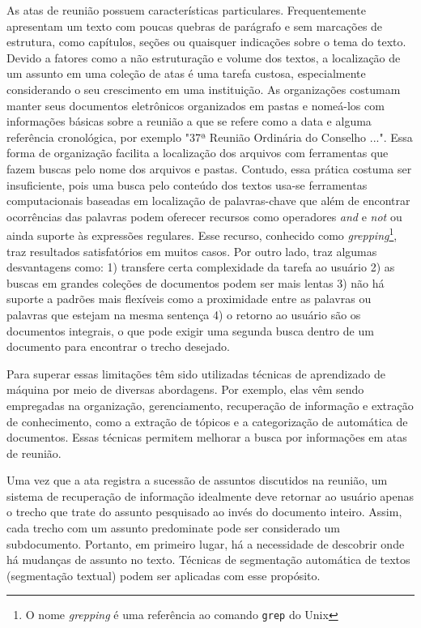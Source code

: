 As atas de reunião possuem características particulares. Frequentemente apresentam um texto com poucas quebras de parágrafo e sem marcações de estrutura, como capítulos, seções ou quaisquer indicações sobre o tema do texto. Devido a fatores como a não estruturação e volume dos textos, a localização de um assunto em uma coleção de atas é uma tarefa custosa, especialmente considerando o seu crescimento em uma instituição. 
As organizações costumam manter seus documentos eletrônicos organizados em pastas e nomeá-los com informações básicas sobre a reunião a que se refere como a data e alguma referência cronológica, por exemplo "37ª Reunião Ordinária do Conselho ...". Essa forma de organização facilita a localização dos arquivos com ferramentas que fazem buscas pelo nome dos arquivos e pastas. Contudo, essa prática costuma ser insuficiente, pois uma busca pelo conteúdo dos textos usa-se ferramentas computacionais baseadas em localização de palavras-chave que além de encontrar ocorrências das palavras podem oferecer recursos como operadores \textit{and} e \textit{not} ou ainda suporte às expressões regulares. Esse recurso, conhecido como \textit{grepping}\footnote{O nome \textit{grepping} é uma referência ao comando \texttt{grep} do Unix}, traz resultados satisfatórios em muitos casos. Por outro lado, traz algumas desvantagens como: 1) transfere certa complexidade da tarefa ao usuário 2) as buscas em grandes coleções de documentos podem ser mais lentas 3) não há suporte a padrões mais flexíveis como a proximidade entre as palavras ou palavras que estejam na mesma sentença 4) o retorno ao usuário são os documentos integrais, o que pode exigir uma segunda busca dentro de um documento para encontrar o trecho desejado. 


Para superar essas limitações têm sido utilizadas técnicas de aprendizado de máquina por meio de diversas abordagens. Por exemplo, elas  vêm sendo empregadas na organização, gerenciamento, recuperação de informação e extração de conhecimento, como a extração de tópicos e a categorização de automática de documentos. Essas técnicas permitem melhorar a busca por informações em atas de reunião. 



Uma vez que a ata registra a sucessão de assuntos discutidos na reunião, um sistema de recuperação de informação idealmente deve retornar ao usuário apenas o trecho que trate do assunto pesquisado ao invés do documento inteiro. Assim, cada trecho com um assunto predominate pode ser considerado um subdocumento. Portanto, em primeiro lugar, há a necessidade de descobrir onde há mudanças de assunto no texto. Técnicas de segmentação automática de textos (segmentação textual) podem ser aplicadas com esse propósito.

